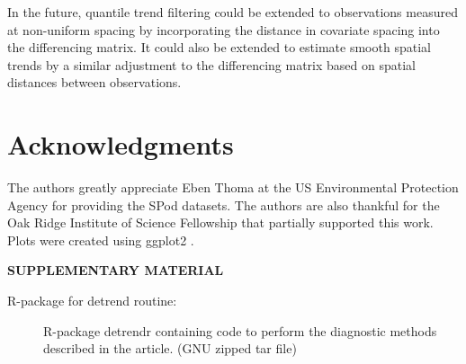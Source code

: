 \documentclass[aoas]{imsart}
\begin{document}
In the future, quantile trend filtering could be extended to observations measured at non-uniform spacing by incorporating the distance in covariate spacing into the differencing matrix. It could also be extended to estimate smooth spatial trends by a similar adjustment to the differencing matrix based on spatial distances between observations.

\section{Acknowledgments}
The authors greatly appreciate Eben Thoma at the US Environmental Protection Agency for providing the SPod datasets. The authors are also thankful for the Oak Ridge Institute of Science Fellowship that partially supported this work. Plots were created using ggplot2 \citep{ggplot2}.  


\bigskip
\begin{center}
	{\large\bf SUPPLEMENTARY MATERIAL}
\end{center}

\begin{description}
	
	\item[R-package for detrend routine:] R-package detrendr containing code to perform the diagnostic methods described in the article. (GNU zipped tar file)
	
\end{description}




\end{document}
